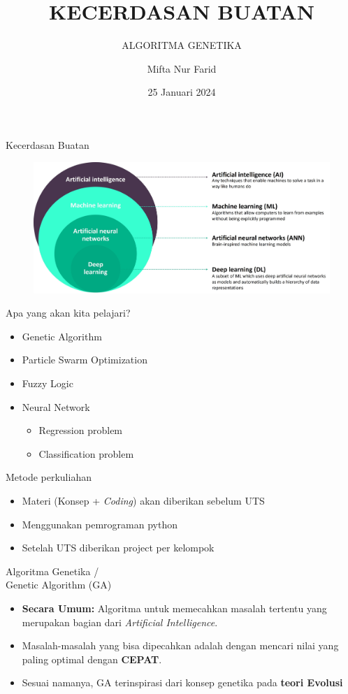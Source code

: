 \documentclass[pdflatex,compress,mathserif]{beamer}
\title{KECERDASAN BUATAN}
\subtitle{ALGORITMA GENETIKA}
\author{Mifta Nur Farid}
\date{25 Januari 2024}
\begin{document}
\maketitle

\begin{frame}{Kecerdasan Buatan}
	\begin{figure}
		\includegraphics[width=\linewidth]{img/01}
	\end{figure}
\end{frame}

\begin{frame}{Apa yang akan kita pelajari?}
	\begin{itemize}
		\item Genetic Algorithm
		\item Particle Swarm Optimization
		\item Fuzzy Logic
		\item Neural Network
		\begin{itemize}
			\item Regression problem
			\item Classification problem
		\end{itemize}
	\end{itemize}
\end{frame}

\begin{frame}{Metode perkuliahan}
	\begin{itemize}
		\item Materi (Konsep + \emph{Coding}) akan diberikan sebelum UTS
		\item Menggunakan pemrograman python
		\item Setelah UTS diberikan project per kelompok
	\end{itemize}
\end{frame}

\begin{frame}{Algoritma Genetika / \\Genetic Algorithm (GA)}
	\begin{itemize}
		\item \textbf{Secara Umum:} Algoritma untuk memecahkan masalah tertentu yang merupakan bagian dari \emph{Artificial Intelligence}.
		\item Masalah-masalah yang bisa dipecahkan adalah dengan mencari nilai yang paling optimal dengan \textbf{CEPAT}.
		\item Sesuai namanya, GA terinspirasi dari konsep genetika pada \textbf{teori Evolusi}
	\end{itemize}
\end{frame}
\end{document}
